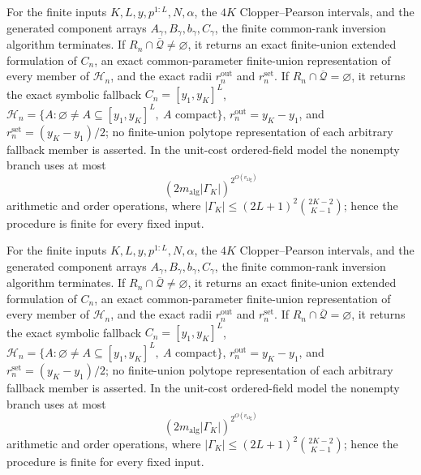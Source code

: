 For the finite inputs \(K,L,y,p^{1:L},N,\alpha\), the \(4K\) Clopper--Pearson intervals, and the generated component arrays \(A_\gamma,B_\gamma,b_\gamma,C_\gamma\), the finite common-rank inversion algorithm terminates.  If \(R_n\cap\overline{\mathcal Q}\ne\varnothing\), it returns an exact finite-union extended formulation of \(C_n\), an exact common-parameter finite-union representation of every member of \(\mathcal H_n\), and the exact radii \(r_n^{\mathrm{out}}\) and \(r_n^{\mathrm{set}}\).  If \(R_n\cap\overline{\mathcal Q}=\varnothing\), it returns the exact symbolic fallback \(C_n=[y_1,y_K]^L\), \(\mathcal H_n=\{A:\varnothing\ne A\subseteq[y_1,y_K]^L,\ A\text{ compact}\}\), \(r_n^{\mathrm{out}}=y_K-y_1\), and \(r_n^{\mathrm{set}}=(y_K-y_1)/2\); no finite-union polytope representation of each arbitrary fallback member is asserted.  In the unit-cost ordered-field model the nonempty branch uses at most
\[
(2m_{\mathrm{alg}}|\Gamma_K|)^{2^{O(v_{\mathrm{alg}})}}
\]
arithmetic and order operations, where \(|\Gamma_K|\le(2L+1)^2\binom{2K-2}{K-1}\); hence the procedure is finite for every fixed input.

For the finite inputs \(K,L,y,p^{1:L},N,\alpha\), the \(4K\) Clopper--Pearson intervals, and the generated component arrays \(A_\gamma,B_\gamma,b_\gamma,C_\gamma\), the finite common-rank inversion algorithm terminates.  If \(R_n\cap\overline{\mathcal Q}\ne\varnothing\), it returns an exact finite-union extended formulation of \(C_n\), an exact common-parameter finite-union representation of every member of \(\mathcal H_n\), and the exact radii \(r_n^{\mathrm{out}}\) and \(r_n^{\mathrm{set}}\).  If \(R_n\cap\overline{\mathcal Q}=\varnothing\), it returns the exact symbolic fallback \(C_n=[y_1,y_K]^L\), \(\mathcal H_n=\{A:\varnothing\ne A\subseteq[y_1,y_K]^L,\ A\text{ compact}\}\), \(r_n^{\mathrm{out}}=y_K-y_1\), and \(r_n^{\mathrm{set}}=(y_K-y_1)/2\); no finite-union polytope representation of each arbitrary fallback member is asserted.  In the unit-cost ordered-field model the nonempty branch uses at most
\[
(2m_{\mathrm{alg}}|\Gamma_K|)^{2^{O(v_{\mathrm{alg}})}}
\]
arithmetic and order operations, where \(|\Gamma_K|\le(2L+1)^2\binom{2K-2}{K-1}\); hence the procedure is finite for every fixed input.

